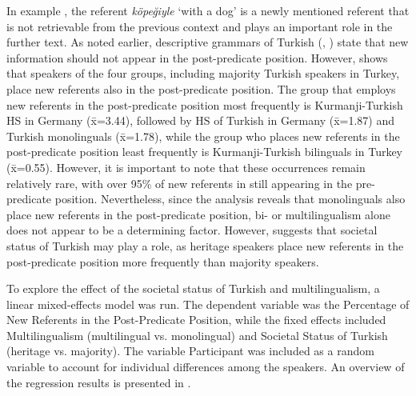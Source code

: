 In example , the referent \textit{köpeğiyle} ‘with a dog’ is a newly mentioned referent that is not retrievable from the previous context and plays an important role in the further text. As noted earlier, descriptive grammars of Turkish (\citealt{Kornfilt1997}, \citealt{GokselKerslake2004}) state that new information should not appear in the post-predicate position. However,  shows that speakers of the four groups, including majority Turkish speakers in Turkey, place new referents also in the post-predicate position. The group that employs new referents in the post-predicate position most frequently is Kurmanji-Turkish HS in Germany (\={x}=3.44), followed by HS of Turkish in Germany (\={x}=1.87) and Turkish monolinguals (\={x}=1.78), while the group who places new referents in the post-predicate position least frequently is Kurmanji-Turkish bilinguals in Turkey (\={x}=0.55). However, it is important to note that these occurrences remain relatively rare, with over 95\% of new referents in still appearing in the pre-predicate position. Nevertheless, since the analysis reveals that monolinguals also place new referents in the post-predicate position, bi- or multilingualism alone does not appear to be a determining factor. However,  suggests that societal status of Turkish may play a role, as heritage speakers place new referents in the post-predicate position more frequently than majority speakers.

To explore the effect of the societal status of Turkish and multilingualism, a linear mixed-effects model was run. The dependent variable was the Percentage of New Referents in the Post-Predicate Position, while the fixed effects included Multilingualism (multilingual vs. monolingual) and Societal Status of Turkish (heritage vs. majority). The variable Participant was included as a random variable to account for individual differences among the speakers. An overview of the regression results is presented in .

